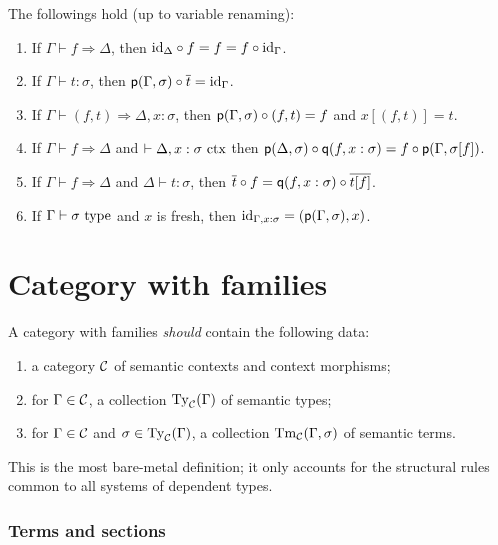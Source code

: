 \documentclass[a4paper]{article}
\begin{document}
\begin{proposition}
  The followings hold (up to variable renaming):
  \begin{enumerate}
  \item If $\Gamma \vdash f \Rightarrow \Delta$, then $\mathrm{id}_{\Delta} \circ f = f = f \circ \mathrm{id}_{\Gamma}$.
  \item If $\Gamma \vdash t : \sigma$, then $\operatorname{\mathsf{p}}(\Gamma,\sigma) \circ \overline{t} = \mathrm{id}_{\Gamma}$.
  \item If $\Gamma \vdash (f,t) \Rightarrow \Delta,x : \sigma$, then $\operatorname{\mathsf{p}}(\Gamma,\sigma) \circ (f, t) = f$ and $x[(f,t)] = t$.
  \item If $\Gamma \vdash f \Rightarrow \Delta$ and $\vdash \Delta,x : \sigma~\mathrm{ctx}$ then $\operatorname{\mathsf{p}}(\Delta,\sigma) \circ \operatorname{\mathsf{q}}(f,x:\sigma) = f \circ \operatorname{\mathsf{p}}(\Gamma,\sigma[f])$.
  \item If $\Gamma \vdash f \Rightarrow \Delta$ and $\Delta \vdash t : \sigma$, then $\overline{t} \circ f = \operatorname{\mathsf{q}}(f,x : \sigma) \circ \overline{t[f]}$.
  \item If $\Gamma \vdash \sigma~\mathrm{type}$ and $x$ is fresh, then $\mathrm{id}_{\Gamma,x:\sigma} = (\operatorname{\mathsf{p}}(\Gamma,\sigma),x)$.
  \end{enumerate}
\end{proposition}

\section{Category with families}\label{sec:cwf}

A category with families \emph{should} contain the following data:
\begin{enumerate}
\item a category $\mathcal{C}$ of semantic contexts and context morphisms;
\item for $\Gamma \in \mathcal{C}$, a collection $\operatorname{Ty}_{\mathcal{C}}(\Gamma)$ of semantic types;
\item for $\Gamma \in \mathcal{C}$ and $\sigma \in \operatorname{Ty}_{\mathcal{C}}(\Gamma)$, a collection $\operatorname{Tm}_{\mathcal{C}}(\Gamma,\sigma)$ of semantic terms.
\end{enumerate}

This is the most bare-metal definition; it only accounts for the structural rules common to all systems of dependent types.



\subsubsection{Terms and sections}\label{sec:tas}
\end{document}
